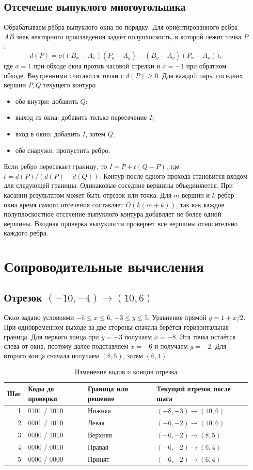 \documentclass[12pt,a4paper]{extarticle}
\begin{document}
\subsection{Отсечение выпуклого многоугольника}
Обрабатываем рёбра выпуклого окна по порядку. Для ориентированного ребра $AB$ знак векторного произведения задаёт полуплоскость, в которой лежит точка $P$:
\[
 d(P)=\sigma\big((B_x-A_x)(P_y-A_y)-(B_y-A_y)(P_x-A_x)\big),
\]
где $\sigma=1$ при обходе окна против часовой стрелки и $\sigma=-1$ при обратном обходе. Внутренними считаются точки с $d(P)\ge0$. Для каждой пары соседних вершин $P,Q$ текущего контура:
\begin{itemize}
\item обе внутри: добавить $Q$;
\item выход из окна: добавить только пересечение $I$;
\item вход в окно: добавить $I$, затем $Q$;
\item обе снаружи: пропустить ребро.
\end{itemize}
Если ребро пересекает границу, то $I=P+t(Q-P)$, где $t=d(P)/(d(P)-d(Q))$. Контур после одного прохода становится входом для следующей границы. Одинаковые соседние вершины объединяются. При касании результатом может быть отрезок или точка. Для $m$ вершин и $k$ рёбер окна время самого отсечения составляет $O(k(m+k))$, так как каждое полуплоскостное отсечение выпуклого контура добавляет не более одной вершины. Входная проверка выпуклости проверяет все вершины относительно каждого ребра.

\clearpage
\section{Сопроводительные вычисления}
\subsection{Отрезок $(-10,-4)\to(10,6)$}
Окно задано условиями $-6\le x\le6$, $-3\le y\le5$. Уравнение прямой $y=1+x/2$. При одновременном выходе за две стороны сначала берётся горизонтальная граница. Для первого конца при $y=-3$ получаем $x=-8$. Эта точка остаётся слева от окна, поэтому далее подставляем $x=-6$ и получаем $y=-2$. Для второго конца сначала получаем $(8,5)$, затем $(6,4)$.

\begin{table}[H]
\centering\small
\caption{Изменение кодов и концов отрезка}
\begin{tabular}{rlll}
\toprule
Шаг & Коды до проверки & Граница или решение & Текущий отрезок после шага \\
\midrule
1 & 0101 / 1010 & Нижняя & $(-8,-3)\to(10,6)$ \\
2 & 0001 / 1010 & Левая & $(-6,-2)\to(10,6)$ \\
3 & 0000 / 1010 & Верхняя & $(-6,-2)\to(8,5)$ \\
4 & 0000 / 0010 & Правая & $(-6,-2)\to(6,4)$ \\
5 & 0000 / 0000 & Принят & $(-6,-2)\to(6,4)$ \\
\bottomrule
\end{tabular}
\end{table}
\end{document}

